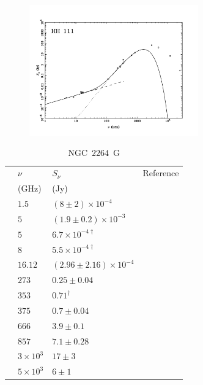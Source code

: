 \documentclass[9pt]{extarticle}   	%
\begin{document}
\begin{figure}[htbp]
\begin{center}
\includegraphics[width=0.65\textwidth]{plots/HH111.pdf}
\label{default}
\end{center}
\end{figure}

\clearpage



\begin{table}
\caption{NGC~$2264$~G}
\begin{center}
\begin{tabular}{llll}
\hline
 & $\nu$ & $S_\nu$ & Reference\\
 & (GHz) & (Jy) & \\
\hline
 & $1.5$ & $(8\pm2)\times10^{-4}$ & \citet{1989RMxAA..17..115R}\\
 & $5$ & $(1.9\pm0.2)\times10^{-3}$ & \citet{1989RMxAA..17..115R}\\
 & $5$ & $6.7\times10^{-4\dag}$ & \citet{1994ApJ...436..749G}\\
 & $8$ & $5.5\times10^{-4\dag}$ & \citet{1994ApJ...436..749G}\\
 & $16.12$ & $(2.96\pm2.16)\times10^{-4}$ & \citet{2012MNRAS.423.1089A}\\
 & $273$ & $0.25\pm0.04$ & \citet{1995MNRAS.273L..25W}\\
 & $353$ & $0.71^{\dag}$ & \citet{2008ApJS..175..277D}\\
 & $375$ & $0.7\pm0.04$ & \citet{1995MNRAS.273L..25W}\\
 & $666$ & $3.9\pm0.1$ & \citet{1995MNRAS.273L..25W}\\
 & $857$ & $7.1\pm0.28$ & \citet{1995MNRAS.273L..25W}\\
 & $3\times10^{3}$ & $17\pm3$ & \citet{1995MNRAS.273L..25W}\\
 & $5\times10^{3}$ & $6\pm1$ & \citet{1995MNRAS.273L..25W}\\
\end{tabular}
\end{center}
\label{default}
\end{table}%
\end{document}
